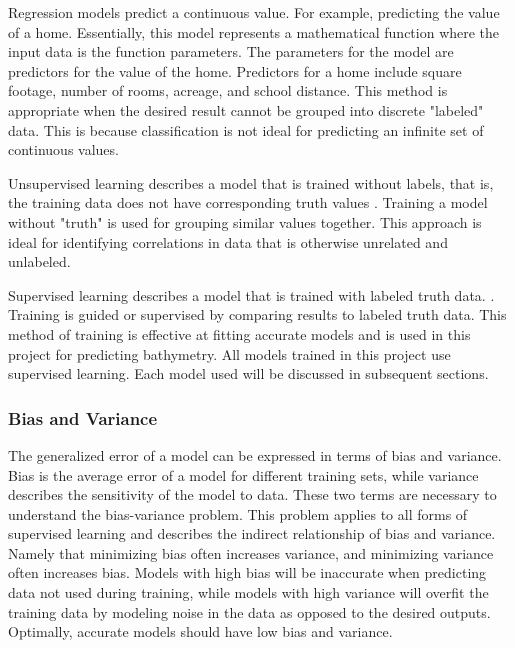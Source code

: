 \par
Regression models predict a continuous value.
For example, predicting the value of a home.
Essentially, this model represents a mathematical function where the input data is the function parameters.
The parameters for the model are predictors for the value of the home.
Predictors for a home include square footage, number of rooms, acreage, and school distance.
This method is appropriate when the desired result cannot be grouped into discrete "labeled" data.
This is because classification is not ideal for predicting an infinite set of continuous values.

\par
Unsupervised learning describes a model that is trained without labels, that is, the training data does not have corresponding truth values \cite{bishop2006pattern}.
Training a model without "truth" is used for grouping similar values together.
This approach is ideal for identifying correlations in data that is otherwise unrelated and unlabeled.

\par
Supervised learning describes a model that is trained with labeled truth data. \cite{bishop2006pattern}.
Training is guided or supervised by comparing results to labeled truth data.
This method of training is effective at fitting accurate models and is used in this project for predicting bathymetry.
All models trained in this project use supervised learning.
Each model used will be discussed in subsequent sections.

\subsubsection{Bias and Variance}
The generalized error of a model can be expressed in terms of bias and variance.
Bias is the average error of a model for different training sets, while variance describes the sensitivity of the model to data.
These two terms are necessary to understand the bias-variance problem.
This problem applies to all forms of supervised learning \cite{geman1992neural} and describes the indirect relationship of bias and variance.
Namely that minimizing bias often increases variance, and minimizing variance often increases bias.
Models with high bias will be inaccurate when predicting data not used during training, while models with high variance will overfit \cite{cawley2010over} the training data by modeling noise in the data as opposed to the desired outputs.
Optimally, accurate models should have low bias and variance.

